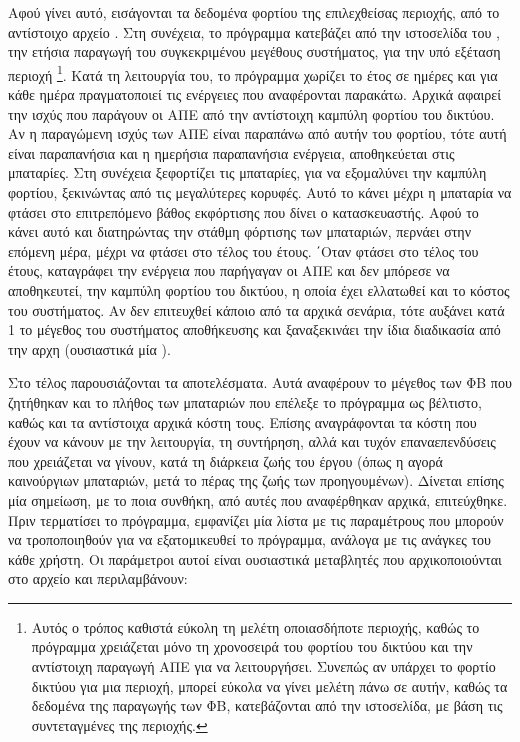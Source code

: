 \documentclass[12pt]{report}
\begin{document}
Αφού γίνει αυτό, εισάγονται τα δεδομένα φορτίου της επιλεχθείσας περιοχής, από το αντίστοιχο αρχείο {}. Στη συνέχεια, το πρόγραμμα κατεβάζει από την ιστοσελίδα του {}, την ετήσια
παραγωγή του συγκεκριμένου μεγέθους συστήματος, για την υπό εξέταση περιοχή \footnote{Αυτός ο τρόπος καθιστά εύκολη τη μελέτη οποιασδήποτε περιοχής, καθώς το πρόγραμμα χρειάζεται μόνο τη
χρονοσειρά του φορτίου του δικτύου και την αντίστοιχη παραγωγή ΑΠΕ για να λειτουργήσει. Συνεπώς αν υπάρχει το φορτίο δικτύου για μια περιοχή, μπορεί εύκολα να γίνει μελέτη πάνω σε αυτήν, καθώς τα δεδομένα της παραγωγής
των ΦΒ, κατεβάζονται από την ιστοσελίδα, με βάση τις συντεταγμένες της περιοχής.}.
Κατά τη λειτουργία του, το πρόγραμμα χωρίζει το έτος σε ημέρες και για κάθε ημέρα πραγματοποιεί τις ενέργειες που αναφέρονται παρακάτω. Αρχικά αφαιρεί την ισχύς που παράγουν οι ΑΠΕ από την αντίστοιχη καμπύλη φορτίου του δικτύου. 
Αν η παραγώμενη ισχύς των ΑΠΕ είναι παραπάνω από αυτήν του φορτίου, τότε αυτή είναι παραπανήσια και η ημερήσια παραπανήσια ενέργεια, αποθηκεύεται στις μπαταρίες. Στη συνέχεια ξεφορτίζει τις μπαταρίες, για να εξομαλύνει την καμπύλη
φορτίου, ξεκινώντας από τις μεγαλύτερες κορυφές. Αυτό το κάνει μέχρι η μπαταρία να φτάσει στο επιτρεπόμενο βάθος εκφόρτισης που δίνει ο κατασκευαστής. Αφού το κάνει αυτό και διατηρώντας
την στάθμη φόρτισης των μπαταριών, περνάει στην επόμενη μέρα, μέχρι να φτάσει στο τέλος του έτους. ΄Οταν φτάσει στο τέλος του έτους, καταγράφει την ενέργεια που παρήγαγαν οι ΑΠΕ και δεν
μπόρεσε να αποθηκευτεί, την καμπύλη φορτίου του δικτύου, η οποία έχει ελλατωθεί και το κόστος του συστήματος. Αν δεν επιτευχθεί κάποιο από τα αρχικά σενάρια, τότε αυξάνει κατά 1 το μέγεθος
του συστήματος αποθήκευσης και ξαναξεκινάει την ίδια διαδικασία από την αρχη (ουσιαστικά μία {}).

Στο τέλος παρουσιάζονται τα αποτελέσματα. Αυτά αναφέρουν το μέγεθος των ΦΒ που ζητήθηκαν και το πλήθος των μπαταριών που επέλεξε το πρόγραμμα ως βέλτιστο, καθώς και τα αντίστοιχα
αρχικά κόστη τους. Επίσης αναγράφονται τα κόστη που έχουν να κάνουν με την λειτουργία, τη συντήρηση, αλλά και τυχόν επαναεπενδύσεις που χρειάζεται να γίνουν, κατά τη διάρκεια ζωής του
έργου (όπως η αγορά καινούργιων μπαταριών, μετά το πέρας της ζωής των προηγουμένων). Δίνεται επίσης μία σημείωση, με το ποια συνθήκη, από αυτές που αναφέρθηκαν αρχικά, επιτεύχθηκε. Πριν
τερματίσει το πρόγραμμα, εμφανίζει μία λίστα με τις παραμέτρους που μπορούν να τροποποιηθούν για να εξατομικευθεί το πρόγραμμα, ανάλογα με τις ανάγκες του κάθε χρήστη. Οι παράμετροι αυτοί
είναι ουσιαστικά μεταβλητές που αρχικοποιούνται στο αρχείο {} και περιλαμβάνουν:
\end{document}
